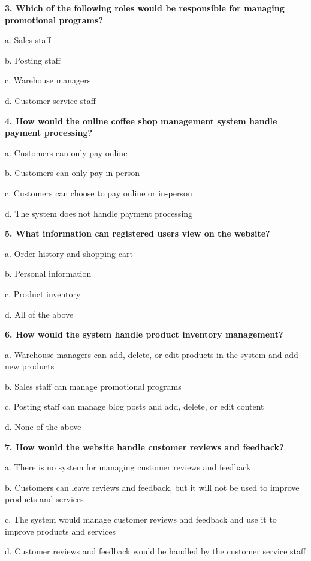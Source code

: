 \textbf{3. Which of the following roles would be responsible for managing promotional programs?}

a. Sales staff

b. Posting staff

c. Warehouse managers

d. Customer service staff

\medskip

\textbf{4. How would the online coffee shop management system handle payment processing?}

a. Customers can only pay online

b. Customers can only pay in-person

c. Customers can choose to pay online or in-person

d. The system does not handle payment processing

\medskip

\textbf{5. What information can registered users view on the website?}

a. Order history and shopping cart

b. Personal information

c. Product inventory

d. All of the above

\medskip

\textbf{6. How would the system handle product inventory management?}

a. Warehouse managers can add, delete, or edit products in the system and add new products

b. Sales staff can manage promotional programs

c. Posting staff can manage blog posts and add, delete, or edit content

d. None of the above

\medskip

\textbf{7. How would the website handle customer reviews and feedback?}

a. There is no system for managing customer reviews and feedback

b. Customers can leave reviews and feedback, but it will not be used to improve products and services

c. The system would manage customer reviews and feedback and use it to improve products and services

d. Customer reviews and feedback would be handled by the customer service staff

\medskip


